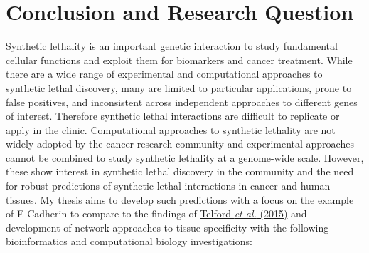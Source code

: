 \clearpage\section{Conclusion and Research Question}

Synthetic lethality is an important genetic interaction to study
fundamental cellular functions and exploit them for biomarkers and
cancer treatment. While there are a wide range of experimental and
computational approaches to synthetic lethal discovery, many are
limited to particular applications, prone to false positives, and
inconsistent across independent approaches to different genes of
interest. Therefore synthetic lethal interactions are difficult to
replicate or apply in the clinic. Computational approaches to
synthetic lethality are not widely adopted by the cancer research
community and experimental approaches cannot be combined to study
synthetic lethality at a genome-wide scale. However, these show
interest in synthetic lethal discovery in the community and the need
for robust predictions of synthetic lethal interactions in cancer and
human tissues. My thesis aims to develop such predictions with a
focus on the example of E-Cadherin to compare to the findings of
\hyperlink{ENREF94}{Telford}\hyperlink{ENREF94}{\textit{ et
al.}}\hyperlink{ENREF94}{ (2015)} and development of network approaches
to tissue specificity with the following bioinformatics and
computational biology investigations:

